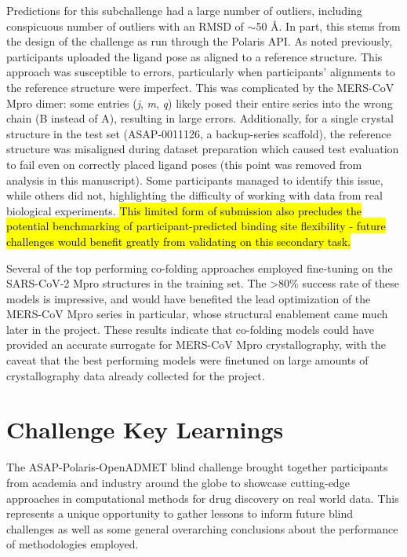 \documentclass[journal=jcim,manuscript=article]{achemso}
\begin{document}
Predictions for this subchallenge had a large number of outliers, including conspicuous number of outliers with an RMSD of $\sim$50 Å. In part, this stems from the design of the challenge as run through the Polaris API. As noted previously, participants uploaded the ligand pose as aligned to a reference structure. This approach was susceptible to errors, particularly when participants’ alignments to the reference structure were imperfect. This was complicated by the MERS-CoV Mpro dimer: some entries (\textit{j}, \textit{m}, \textit{q}) likely posed their entire series into the wrong chain (B instead of A), resulting in large errors. Additionally, for a single crystal structure in the test set (ASAP-0011126, a backup-series scaffold), the reference structure was misaligned during dataset preparation which caused test evaluation to fail even on correctly placed ligand poses (this point was removed from analysis in this manuscript). Some participants managed to identify this issue, while others did not, highlighting the difficulty of working with data from real biological experiments. \hl{This limited form of submission also precludes the potential benchmarking of participant-predicted binding site flexibility - future challenges would benefit greatly from validating on this secondary task.}

Several of the top performing co-folding approaches employed fine-tuning on the SARS-CoV-2 Mpro structures in the training set. The \textgreater 80\% success rate of these models is impressive, and would have benefited the lead optimization of the MERS-CoV Mpro series in particular, whose structural enablement came much later in the project. These results indicate that co-folding models could have provided an accurate surrogate for MERS-CoV Mpro crystallography, with the caveat that the best performing models were finetuned on large amounts of crystallography data already collected for the project.

\section{Challenge Key Learnings}

The ASAP-Polaris-OpenADMET blind challenge brought together participants from academia and industry around the globe to showcase cutting-edge approaches in computational methods for drug discovery on real world data. This represents a unique opportunity to gather lessons to inform future blind challenges as well as some general overarching conclusions about the performance of methodologies employed.
\end{document}
